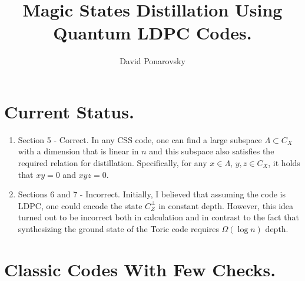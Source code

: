 \documentclass[manuscript,screen,review]{acmart}
\begin{document}

\title{Magic States Distillation Using Quantum LDPC Codes. } 
\author{David Ponarovsky}
\maketitle




\section{Current Status.}

\begin{enumerate}
  \item Section 5 - Correct. In any CSS code, one can find a large subspace $\Lambda \subset C_{X}$ with a dimension that is linear in $n$ and this subspace also satisfies the required relation for distillation. Specifically, for any $x \in \Lambda$, $y, z \in C_{X}$, it holds that $xy = 0$ and $xyz = 0$.
  \item Sections 6 and 7 - Incorrect. Initially, I believed that assuming the code is LDPC, one could encode the state $C_{Z}^{\perp}$ in constant depth. However, this idea turned out to be incorrect both in calculation and in contrast to the fact that synthesizing the ground state of the Toric code requires $\Omega(\log n)$ depth.
\end{enumerate}

\section{Classic Codes With Few Checks.}
\end{document}
